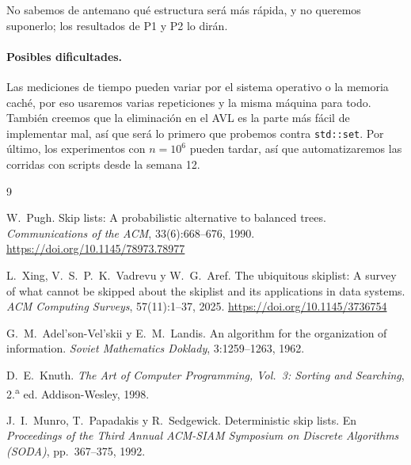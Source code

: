 \documentclass[11pt,a4paper]{article}
\begin{document}
No sabemos de antemano qué estructura será más rápida, y no queremos
suponerlo; los resultados de P1 y P2 lo dirán.

\paragraph{Posibles dificultades.}
Las mediciones de tiempo pueden variar por el sistema operativo o la memoria
caché, por eso usaremos varias repeticiones y la misma máquina para todo.
También creemos que la eliminación en el AVL es la parte más fácil de
implementar mal, así que será lo primero que probemos contra
\texttt{std::set}. Por último, los experimentos con $n = 10^6$ pueden
tardar, así que automatizaremos las corridas con scripts desde la semana 12.

\begin{thebibliography}{9}
\small
\setlength{\itemsep}{1pt}

W.~Pugh.
\newblock Skip lists: A probabilistic alternative to balanced trees.
\newblock \emph{Communications of the ACM}, 33(6):668--676, 1990.
\newblock \url{https://doi.org/10.1145/78973.78977}

L.~Xing, V.~S.~P.~K.~Vadrevu y W.~G.~Aref.
\newblock The ubiquitous skiplist: A survey of what cannot be skipped about the
skiplist and its applications in data systems.
\newblock \emph{ACM Computing Surveys}, 57(11):1--37, 2025.
\newblock \url{https://doi.org/10.1145/3736754}

G.~M.~Adel'son-Vel'skii y E.~M.~Landis.
\newblock An algorithm for the organization of information.
\newblock \emph{Soviet Mathematics Doklady}, 3:1259--1263, 1962.

D.~E.~Knuth.
\newblock \emph{The Art of Computer Programming, Vol.~3: Sorting and
Searching}, 2.\textsuperscript{a} ed.
\newblock Addison-Wesley, 1998.

J.~I.~Munro, T.~Papadakis y R.~Sedgewick.
\newblock Deterministic skip lists.
\newblock En \emph{Proceedings of the Third Annual ACM-SIAM Symposium on
Discrete Algorithms (SODA)}, pp.~367--375, 1992.

\end{thebibliography}
\end{document}
